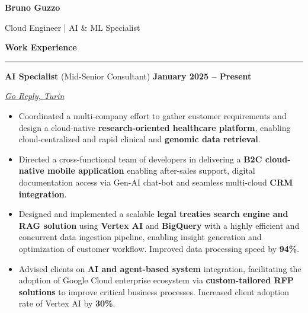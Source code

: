 \documentclass[9pt, a4paper]{article}
\newcommand{\cvsection}[1]{%
	\vspace{2pt}\par
	{\Large\bfseries\color{sectionblue}#1}\par
	\vspace{2pt}\hrule\vspace{6pt}
}
\newcommand{\jobsection}[3]{%
	\par {\large #1} \hfill {\bfseries #2} \par {\textit{#3}} \vspace{4pt}
}
\begin{document}
	
	\begin{center}
		{\Huge\bfseries Bruno Guzzo}\par
		\vspace{4pt}
		{\Large Cloud Engineer | AI \& ML Specialist}
	\end{center}
	
	\begin{minipage}[t]{0.65\linewidth}
		\vspace{0pt} %
		
		\cvsection{Work Experience}
		
		\jobsection{\textbf{AI Specialist} (Mid-Senior Consultant)}{January 2025 -- Present}{\href{https://www.reply.com/go-reply/en}{Go Reply, Turin}}
		
		\begin{itemize}[leftmargin=*, nosep]
			\item \footnotesize Coordinated a multi-company effort to gather customer requirements and design a cloud-native \textbf{research-oriented healthcare platform}, enabling cloud-centralized and rapid clinical and \textbf{genomic data retrieval}.     
			
			\vspace{2pt}
			\item \footnotesize Directed a cross-functional team of developers in delivering a \textbf{B2C cloud-native mobile application} enabling after-sales support, digital documentation access via Gen-AI chat-bot and seamless multi-cloud \textbf{CRM integration}.   
			
			\vspace{2pt}
			\item \footnotesize Designed and implemented a scalable \textbf{legal treaties search engine and RAG solution} using \textbf{Vertex AI} and \textbf{BigQuery} with a highly efficient and concurrent data ingestion pipeline, enabling insight generation and optimization of customer workflow. 
			Improved data processing speed by \textbf{94\%}.  
			
			\vspace{2pt}		
			\item \footnotesize Advised clients on \textbf{AI and agent-based system} integration, facilitating the adoption of Google Cloud enterprise ecosystem via \textbf{custom-tailored RFP solutions} to improve critical business processes.
			Increased client adoption rate of Vertex AI by \textbf{30\%}.  
			

\end{itemize}
\end{minipage}
\end{document}
